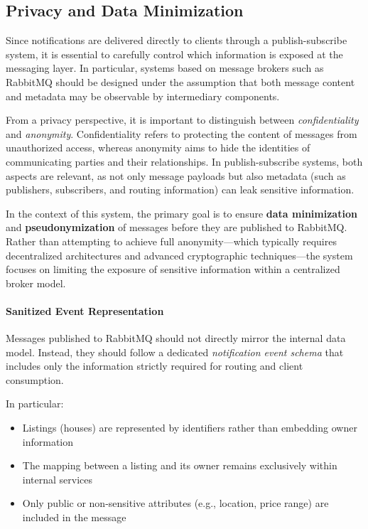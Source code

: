 \subsection{Privacy and Data Minimization}

Since notifications are delivered directly to clients through a publish-subscribe system, it is essential to carefully control which information is exposed at the messaging layer. In particular, systems based on message brokers such as RabbitMQ should be designed under the assumption that both message content and metadata may be observable by intermediary components.

From a privacy perspective, it is important to distinguish between \textit{confidentiality} and \textit{anonymity}. Confidentiality refers to protecting the content of messages from unauthorized access, whereas anonymity aims to hide the identities of communicating parties and their relationships. In publish-subscribe systems, both aspects are relevant, as not only message payloads but also metadata (such as publishers, subscribers, and routing information) can leak sensitive information.

In the context of this system, the primary goal is to ensure \textbf{data minimization} and \textbf{pseudonymization} of messages before they are published to RabbitMQ. Rather than attempting to achieve full anonymity—which typically requires decentralized architectures and advanced cryptographic techniques—the system focuses on limiting the exposure of sensitive information within a centralized broker model.

\paragraph{Sanitized Event Representation}

Messages published to RabbitMQ should not directly mirror the internal data model. Instead, they should follow a dedicated \textit{notification event schema} that includes only the information strictly required for routing and client consumption.

In particular:
\begin{itemize}
    \item Listings (houses) are represented by identifiers rather than embedding owner information
    \item The mapping between a listing and its owner remains exclusively within internal services
    \item Only public or non-sensitive attributes (e.g., location, price range) are included in the message
\end{itemize}

